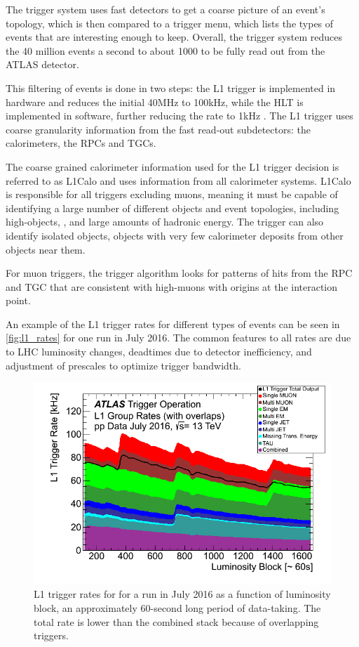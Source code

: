 The trigger system uses fast detectors to get a coarse picture of an event's topology, which is then compared to a trigger menu, which lists the types of events that are interesting enough to keep. Overall, the trigger system reduces the 40 million events a second to about 1000 to be fully read out from the ATLAS detector. 

This filtering of events is done in two steps: the \ac{L1} trigger is implemented in hardware and reduces the initial 40MHz to 100kHz, while the \ac{HLT} is implemented in software, further reducing the rate to 1kHz \cite{ATL-DAQ-PUB-2016-001}. The \ac{L1} trigger uses coarse granularity information from the fast read-out subdetectors: the calorimeters, the \acp{RPC} and \acp{TGC}. 

The coarse grained calorimeter information used for the \ac{L1} trigger decision is referred to as \ac{L1Calo} and uses information from all calorimeter systems. \ac{L1Calo} is responsible for all triggers excluding muons, meaning it must be capable of identifying a large number of different objects and event topologies, including high-\pt objects, \met, and large amounts of hadronic energy. The trigger can also identify isolated objects, objects with very few calorimeter deposits from other objects near them.

For muon triggers, the trigger algorithm looks for patterns of hits from the \ac{RPC} and \ac{TGC} that are consistent with high-\pt muons with origins at the interaction point. 

An example of the \ac{L1} trigger rates for different types of events can be seen in \autoref{fig:l1_rates} for one run in July 2016. The common features to all rates are due to \ac{LHC} luminosity changes, deadtimes due to detector inefficiency, and adjustment of prescales to optimize trigger bandwidth.

\begin{centering}
\begin{figure}[!hbt]
\myfloatalign
\includegraphics[width=.90\linewidth]{figures/atlas/Time_L1GroupRate_Stack_2016_07.png}
\caption{\ac{L1} trigger rates for for a run in July 2016 as a function of luminosity block, an approximately 60-second long period of data-taking. The total rate is lower than the combined stack because of overlapping triggers.}
\label{fig:l1_rates}
\end{figure}
\end{centering}

